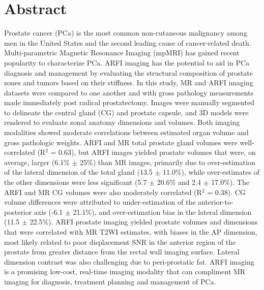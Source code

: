 \section*{Abstract}
Prostate cancer (PCa) is the most common non-cutaneous malignancy among men in
the United States and the second leading cause of cancer-related death.
Multi-parametric Magnetic Resonance Imaging (mpMRI) has gained recent
popularity to characterize PCa.  ARFI imaging has the potential to aid in PCa
diagnosis and management by evaluating the structural composition of prostate
zones and tumors based on their stiffness.  In this study, MR and ARFI imaging
datasets were compared to one another and with gross pathology measurements
made immediately post radical prostatectomy.  Images were manually segmented to
delineate the central gland (CG) and prostate capsule, and 3D models were
rendered to evaluate zonal anatomy dimensions and volumes.  Both imaging
modalities showed moderate correlations between estimated organ volume and
gross pathologic weights.  ARFI and MR total prostate gland volumes were
well-correlated (R$^2$ = 0.63), but ARFI images yielded prostate volumes that
were, on average, larger (6.1\% $\pm$ 25\%) than MR images, primarily due to
over-estimation of the lateral dimension of the total gland (13.5 $\pm$
11.0\%), while over-estimates of the other dimensions were less significant
(5.7 $\pm$ 20.6\% and 2.4 $\pm$ 17.0\%).  The ARFI and MR CG volumes were also
moderately correlated (R$^2$ = 0.38).  CG volume differences were attributed to
under-estimation of the anterior-to-posterior axis (-6.1 $\pm$ 21.1\%), and
over-estimation bias in the lateral dimension (11.5 $\pm$ 22.5\%).  ARFI
prostate imaging yielded prostate volumes and dimensions that were correlated
with MR T2WI estimates, with biases in the AP dimension, most likely related to
poor displacement SNR in the anterior region of the prostate from greater
distance from the rectal wall imaging surface.  Lateral dimension contrast was
also challenging due to peri-prostatic fat.  ARFI imaging is a promising
low-cost, real-time imaging modality that can compliment MR imaging for
diagnosis, treatment planning and management of PCa.
